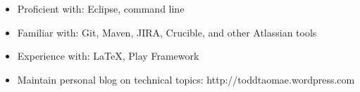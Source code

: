 \documentclass{resume}
\begin{document}
\begin{itemize}
    \item{Proficient with: Eclipse, command line}
    \item{Familiar with: Git, Maven, JIRA, Crucible, and other Atlassian tools}
    \item{Experience with: \LaTeX, Play Framework}
\end{itemize}

\begin{itemize}
    \item{Maintain personal blog on technical topics: http://toddtaomae.wordpress.com}
\end{itemize}
\end{document}
